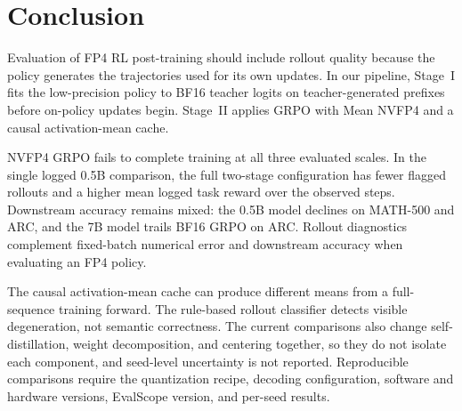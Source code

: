 \documentclass[letterpaper]{article}
\begin{document}
\section{Conclusion}

Evaluation of FP4 RL post-training should include rollout quality because the policy generates the trajectories used for its own updates. In our pipeline, Stage~I fits the low-precision policy to BF16 teacher logits on teacher-generated prefixes before on-policy updates begin. Stage~II applies GRPO with Mean NVFP4 and a causal activation-mean cache.

NVFP4 GRPO fails to complete training at all three evaluated scales. In the single logged 0.5B comparison, the full two-stage configuration has fewer flagged rollouts and a higher mean logged task reward over the observed steps. Downstream accuracy remains mixed: the 0.5B model declines on MATH-500 and ARC, and the 7B model trails BF16 GRPO on ARC. Rollout diagnostics complement fixed-batch numerical error and downstream accuracy when evaluating an FP4 policy.

The causal activation-mean cache can produce different means from a full-sequence training forward. The rule-based rollout classifier detects visible degeneration, not semantic correctness. The current comparisons also change self-distillation, weight decomposition, and centering together, so they do not isolate each component, and seed-level uncertainty is not reported. Reproducible comparisons require the quantization recipe, decoding configuration, software and hardware versions, EvalScope version, and per-seed results.


\end{document}
